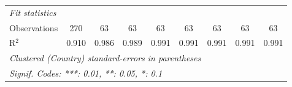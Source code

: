 \begin{table}[htbp]
\begin{tabular}{lcccccccc}
      \midrule \emph{Fit statistics}\\
      Observations                                                                    & 270     & 63      & 63             & 63             & 63             & 63             & 63             & 63\\  
      R$^2$                                                                           & 0.910   & 0.986   & 0.989          & 0.991          & 0.991          & 0.991          & 0.991          & 0.991\\  
      \midrule
      \multicolumn{9}{l}{\emph{Clustered (Country) standard-errors in parentheses}}\\
      \multicolumn{9}{l}{\emph{Signif. Codes: ***: 0.01, **: 0.05, *: 0.1}}\\
   \end{tabular}
\end{table}


